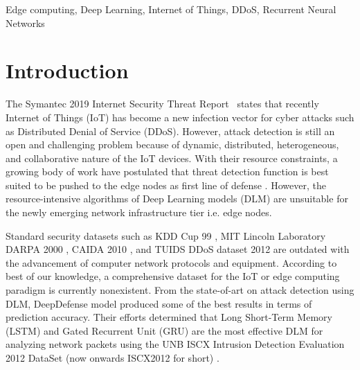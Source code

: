 \documentclass[conference]{IEEEtran}
\begin{document}
\begin{IEEEkeywords}
Edge computing, Deep Learning, Internet of Things, DDoS, Recurrent Neural Networks
\end{IEEEkeywords}

\section{Introduction} \label{Sec:Introduction}
\noindent The Symantec 2019 Internet Security Threat Report~\cite{istr_2019} states that recently Internet of Things (IoT) has become a new infection vector for cyber attacks  such as Distributed Denial of Service (DDoS). 
However, attack detection is still an open and challenging problem because of dynamic, distributed, heterogeneous, and collaborative nature of the IoT devices. 
With their resource constraints, a growing body of work have postulated that threat detection function is best suited to be pushed to the edge nodes as first line of defense \cite{bhardwaj2018towards}. However, the resource-intensive algorithms of Deep Learning models (DLM) are unsuitable for the newly emerging network infrastructure tier i.e. edge nodes. 

Standard security datasets such as KDD Cup 99 \cite{stolfo2000cost}, MIT Lincoln Laboratory DARPA 2000 \cite{lippmann20001999}, CAIDA 2010 \cite{caida2010ddos}, and TUIDS DDoS dataset 2012 \cite{gogoi2012packet} are outdated with the advancement of computer network protocols and equipment.
According to best of our knowledge, a comprehensive dataset for the IoT or edge computing paradigm is currently nonexistent.  
From the state-of-art on attack detection using DLM, DeepDefense model \cite{yuan2017deepdefense} produced some of the best results in terms of prediction accuracy. Their efforts determined that Long Short-Term Memory (LSTM) and Gated Recurrent Unit (GRU) are the most effective DLM for analyzing network packets using the UNB ISCX Intrusion Detection Evaluation 2012 DataSet (now onwards ISCX2012 for short) \cite{shiravi2012toward}.

\iffalse
In the domain of resource constrained devices such as edge and IoT nodes, there has been recent efforts \cite{kusupati2018fastgrnn} in developing fast and light DLM based on Recurrent Neural Networks (RNN) and its gated variations (GRNN). 
They have developed novel neuron FAST cell of size 1 KB, which is faster and efficient in terms of training time, prediction accuracy and prediction cost. 
This cell addresses the limitation of prior bulky inefficient model unit by adding a residual connection and using only two extra scalar parameters. 
Although this cell is crucial building block in IoT paradigm, but without any layering it insufficient to be used as a matured DLM. 
\fi
\end{document}
